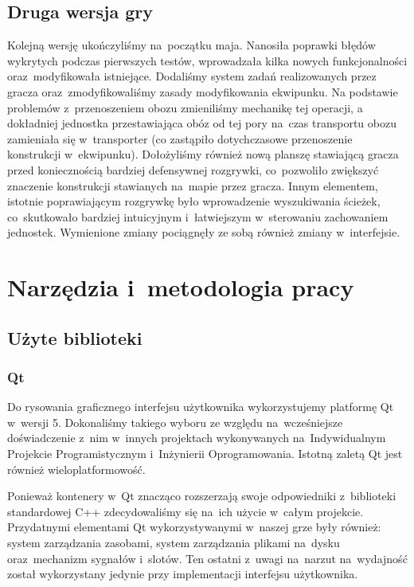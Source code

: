\documentclass[licencjacka]{pracamgr}
\begin{document}
    \section{Druga wersja gry}
    Kolejną wersję ukończyliśmy na~początku maja. Nanosiła poprawki błędów wykrytych podczas pierwszych testów, wprowadzała kilka nowych
    funkcjonalności oraz~modyfikowała istniejące. Dodaliśmy system zadań realizowanych przez gracza oraz~zmodyfikowaliśmy zasady modyfikowania
    ekwipunku. Na podstawie problemów z~przenoszeniem obozu zmieniliśmy mechanikę tej operacji, a dokładniej jednostka przestawiająca
    obóz od tej pory na~czas transportu obozu zamieniała się w~transporter (co zastąpiło dotychczasowe przenoszenie konstrukcji w~ekwipunku).
    Dołożyliśmy również nową planszę stawiającą gracza przed koniecznością bardziej defensywnej rozgrywki,
    co~pozwoliło zwiększyć znaczenie konstrukcji stawianych na~mapie przez gracza. Innym elementem, istotnie poprawiającym
    rozgrywkę było wprowadzenie wyszukiwania ścieżek, co~skutkowało bardziej intuicyjnym i~łatwiejszym w~sterowaniu
    zachowaniem jednostek. Wymienione zmiany pociągnęły ze sobą również zmiany w~interfejsie.

\chapter{Narzędzia i~metodologia pracy}
  \section{Użyte biblioteki}
    \subsection{Qt}
      Do rysowania graficznego interfejsu użytkownika wykorzystujemy platformę Qt\cite{QT} w~wersji 5. Dokonaliśmy takiego wyboru
      ze względu na~wcześniejsze doświadczenie z~nim w~innych projektach wykonywanych na~Indywidualnym Projekcie Programistycznym
      i~Inżynierii Oprogramowania. Istotną zaletą Qt jest również wieloplatformowość.

      Ponieważ kontenery w~Qt znacząco rozszerzają swoje odpowiedniki z~biblioteki standardowej C++ zdecydowaliśmy się na~ich użycie
      w~całym projekcie. Przydatnymi elementami Qt wykorzystywanymi w~naszej grze były również: system zarządzania zasobami,
      system zarządzania plikami na~dysku oraz~mechanizm sygnałów i~slotów. Ten ostatni z~uwagi na~narzut na~wydajność został 
      wykorzystany jedynie przy implementacji interfejsu użytkownika.
\end{document}
